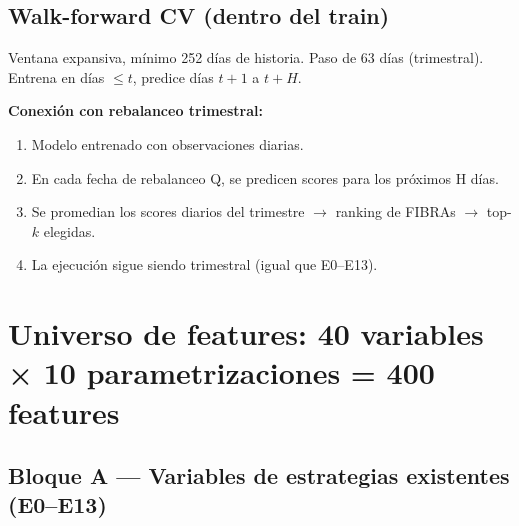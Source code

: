\documentclass[12pt,letterpaper]{article}
\begin{document}
\subsection{Walk-forward CV (dentro del train)}

Ventana expansiva, mínimo 252 días de historia. Paso de 63 días (trimestral).
Entrena en días $\leq t$, predice días $t+1$ a $t+H$.

\medskip
\textbf{Conexión con rebalanceo trimestral:}
\begin{enumerate}[leftmargin=2em]
  \item Modelo entrenado con observaciones diarias.
  \item En cada fecha de rebalanceo Q, se predicen scores para los próximos H días.
  \item Se promedian los scores diarios del trimestre $\to$ ranking de FIBRAs $\to$
        top-$k$ elegidas.
  \item La ejecución sigue siendo trimestral (igual que E0--E13).
\end{enumerate}

\section{Universo de features: 40 variables × 10 parametrizaciones = 400 features}

\subsection{Bloque A — Variables de estrategias existentes (E0--E13)}
\end{document}
